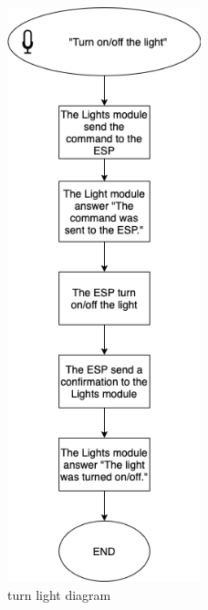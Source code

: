 \begin{figure}[H]
    \centering
    \includegraphics[width=0.5\textwidth]{img/turn_light_diagram.png}
    \caption{turn light diagram}
\end{figure}

